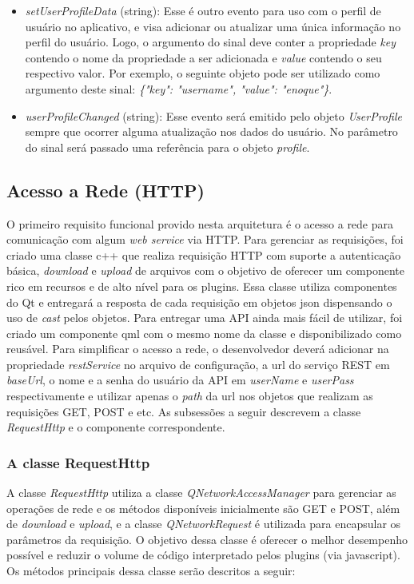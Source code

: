 \begin{itemize}
\begin{itemize}
		\item \textit{setUserProfileData} (string): Esse é outro evento para uso com o perfil de usuário no aplicativo, e visa adicionar ou atualizar uma única informação no perfil do usuário. Logo, o argumento do sinal deve conter a propriedade \textit{key} contendo o nome da propriedade a ser adicionada e \textit{value} contendo o seu respectivo valor. Por exemplo, o seguinte objeto pode ser utilizado como argumento deste sinal: \textit{\{"key": "username", "value": "enoque"\}}.

		\item \textit{userProfileChanged} (string): Esse evento será emitido pelo objeto \textit{UserProfile} sempre que ocorrer alguma atualização nos dados do usuário. No parâmetro do sinal será passado uma referência para o objeto \textit{profile}.
	\end{itemize}
\end{itemize}


\subsection{Acesso a Rede (HTTP)}\label{sec:solucao-desenvolvida}
O primeiro requisito funcional provido nesta arquitetura é o acesso a rede para comunicação com algum \textit{web service} via HTTP. Para gerenciar as requisições, foi criado uma classe c++ que realiza requisição HTTP com suporte a autenticação básica, \textit{download} e \textit{upload} de arquivos com o objetivo de oferecer um componente rico em recursos e de alto nível para os plugins. Essa classe utiliza componentes do Qt e entregará a resposta de cada requisição em objetos json dispensando o uso de \textit{cast} pelos objetos. Para entregar uma API ainda mais fácil de utilizar, foi criado um componente qml com o mesmo nome da classe e disponibilizado como reusável. Para simplificar o acesso a rede, o desenvolvedor deverá adicionar na propriedade \textit{restService} no arquivo de configuração, a url do serviço REST em \textit{baseUrl}, o nome e a senha do usuário da API em \textit{userName} e \textit{userPass} respectivamente e utilizar apenas o \textit{path} da url nos objetos que realizam as requisições GET, POST e etc. As subsessões a seguir descrevem a classe \textit{RequestHttp} e o componente correspondente.

\subsubsection{A classe RequestHttp}\label{sec:solucao-desenvolvida}
A classe \textit{RequestHttp} utiliza a classe \textit{QNetworkAccessManager} para gerenciar as operações de rede e os métodos disponíveis inicialmente são GET e POST, além de \textit{download} e \textit{upload}, e a classe \textit{QNetworkRequest} é utilizada para encapsular os parâmetros da requisição. O objetivo dessa classe é oferecer o melhor desempenho possível e reduzir o volume de código interpretado pelos plugins (via javascript). Os métodos principais dessa classe serão descritos a seguir:

